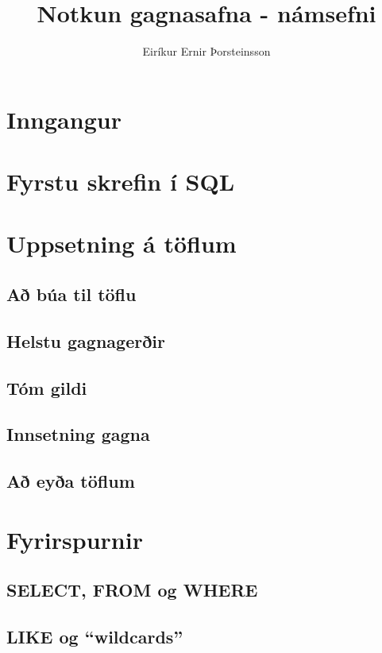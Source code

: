 \documentclass[nohyper,notoc,justified]{tufte-book}
\author{Eiríkur Ernir Þorsteinsson}
\title{Notkun gagnasafna - námsefni}
\date{}
\begin{document}
\setcounter{tocdepth}{2}
\setcounter{secnumdepth}{0}

\maketitle

\tableofcontents

\newpage

\chapter{Inngangur}


\chapter{Fyrstu skrefin í SQL}
\label{kafli:fyrstuskrefin}


\chapter{Uppsetning á töflum}
\section{Að búa til töflu} %
\section{Helstu gagnagerðir} %
\section{Tóm gildi} %
\section{Innsetning gagna} %
\section{Að eyða töflum} %

\chapter{Fyrirspurnir}
\label{kafli:select}
\section{SELECT, FROM og WHERE}
\section{LIKE og ``wildcards''}
\end{document}
